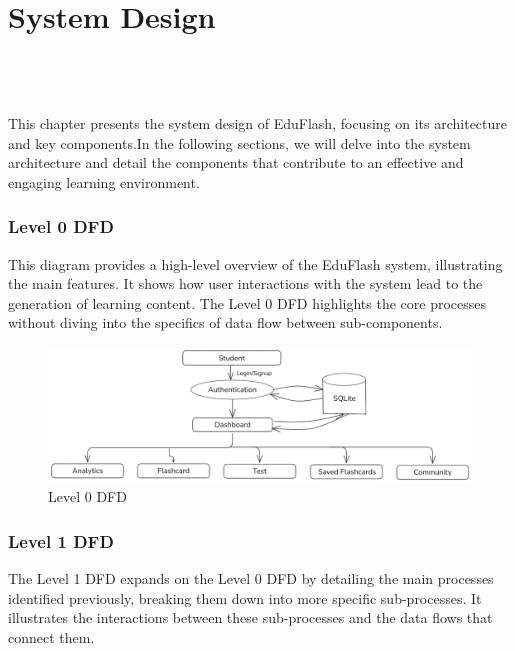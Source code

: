 \documentclass{report}
\begin{document}
\chapter{System Design}
\\
\\
\\
This chapter presents the system design of EduFlash, focusing on its architecture and key components.In the following sections, we will delve into the system architecture and detail the components that contribute to an effective and engaging learning environment.




\subsection{Level 0 DFD}
\Large
This diagram provides a high-level overview of the EduFlash system, illustrating the main features. It shows how user interactions with the system lead to the generation of learning content. The Level 0 DFD highlights the core processes without diving into the specifics of data flow between sub-components. \\

\begin{figure}[h]
    \centering
    \includegraphics[width=\textwidth]{DFD 0.png}
    \caption{Level 0 DFD}
\end{figure}
\clearpage


\vspace{-\baselineskip} %

\subsection{Level 1 DFD}
\Large
The Level 1 DFD expands on the Level 0 DFD by detailing the main processes identified previously, breaking them down into more specific sub-processes. It illustrates the interactions between these sub-processes and the data flows that connect them. \\
\end{document}
